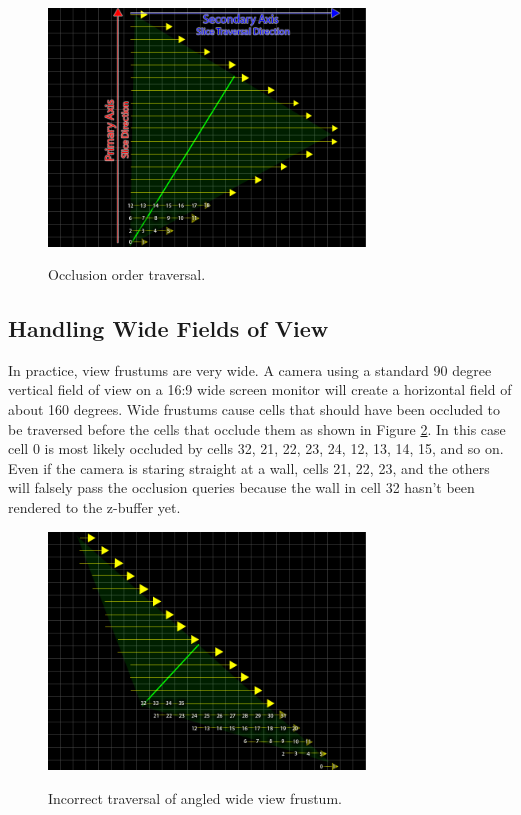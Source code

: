 \documentclass[12pt]{ucthesis}
\newcommand{\captionfonts}{\small\bf\ssp}
\begin{document}
\begin{figure}
\begin{center}
\includegraphics[width=0.75\textwidth]{Images/frustum-iter.png}
\captionfonts
\caption[View Frustum Traversal]{Occlusion order traversal.}
\label{fig:frustum-iter}
\end{center}
\end{figure}

\subsection{Handling Wide Fields of View}
\label{handling-wide-fields-of-view}

In practice, view frustums are very wide.
A camera using a standard 90 degree vertical field of view on a 16:9 wide screen monitor will create a horizontal field of about 160 degrees.
Wide frustums cause cells that should have been occluded to be traversed before the cells that occlude them as shown in Figure \ref{fig:wide-frustum-iter}.
In this case cell 0 is most likely occluded by cells 32, 21, 22, 23, 24, 12, 13, 14, 15, and so on.
Even if the camera is staring straight at a wall, cells 21, 22, 23, and the others will falsely pass the occlusion queries because the wall in cell 32 hasn't been rendered to the z-buffer yet.

\begin{figure}
\begin{center}
\includegraphics[width=0.75\textwidth]{Images/wide-frustum.png}
\captionfonts
\caption[Incorrect Wide View Frustum Traversal]{Incorrect traversal of angled wide view frustum.}
\label{fig:wide-frustum-iter}
\end{center}
\end{figure}
\end{document}
